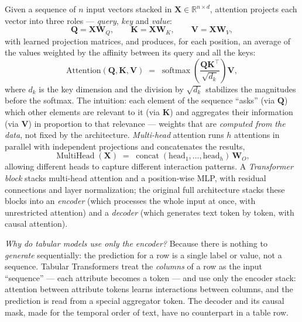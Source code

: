 Given a sequence of $n$ input vectors stacked in
$\mathbf{X} \in \mathbb{R}^{n \times d}$, attention projects each
vector into three roles --- \emph{query}, \emph{key} and
\emph{value}:
\begin{equation}
  \mathbf{Q} = \mathbf{X}\mathbf{W}_Q, \qquad
  \mathbf{K} = \mathbf{X}\mathbf{W}_K, \qquad
  \mathbf{V} = \mathbf{X}\mathbf{W}_V,
  \label{eq:qkv}
\end{equation}
with learned projection matrices, and produces, for each position, an
average of the values weighted by the affinity between its query and
all the keys:
\begin{equation}
  \text{Attention}(\mathbf{Q}, \mathbf{K}, \mathbf{V})
  \;=\; \operatorname{softmax}\!\left(
    \frac{\mathbf{Q}\mathbf{K}^{\top}}{\sqrt{d_k}}
  \right)\mathbf{V},
  \label{eq:atencao}
\end{equation}
where $d_k$ is the key dimension and the division by $\sqrt{d_k}$
stabilizes the magnitudes before the softmax. The intuition: each
element of the sequence ``asks'' (via $\mathbf{Q}$) which other
elements are relevant to it (via $\mathbf{K}$) and aggregates their
information (via $\mathbf{V}$) in proportion to that relevance ---
weights that are \emph{computed from the data}, not fixed by the
architecture. \emph{Multi-head} attention runs $h$ attentions in
parallel with independent projections and concatenates the results,
\begin{equation}
  \operatorname{MultiHead}(\mathbf{X}) \;=\;
  \operatorname{concat}(\text{head}_1, \ldots, \text{head}_h)\,
  \mathbf{W}_O,
  \label{eq:multihead}
\end{equation}
allowing different heads to capture different interaction patterns.
A \emph{Transformer block} stacks multi-head attention and a
position-wise MLP, with residual connections and layer
normalization; the original full architecture stacks these blocks
into an \emph{encoder} (which processes the whole input at once,
with unrestricted attention) and a \emph{decoder} (which generates
text token by token, with causal attention).

\emph{Why do tabular models use only the encoder?} Because there is
nothing to \emph{generate} sequentially: the prediction for a row is
a single label or value, not a sequence. Tabular Transformers treat
the \emph{columns} of a row as the input ``sequence'' --- each
attribute becomes a token --- and use only the encoder stack:
attention between attribute tokens learns interactions between
columns, and the prediction is read from a special aggregator token.
The decoder and its causal mask, made for the temporal order of
text, have no counterpart in a table row.

